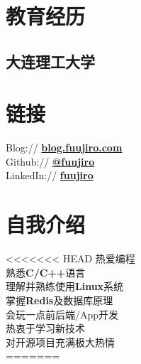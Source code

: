\documentclass[]{deedy-resume-openfont}
\begin{document}
%
%
\lastupdated

%
%

%
%

\begin{minipage}[t]{0.25\textwidth} 


\section{教育经历} 
\sectionsep

\subsection{大连理工大学}
\sectionsep


\section{链接}
\sectionsep
Blog://  \href{https://blog.fuujiro.com/}{\bf blog.fuujiro.com} \\  
Github:// \href{https://github.com/fuujiro}{\bf @fuujiro} \\
LinkedIn://  \href{https://www.linkedin.com/in/fuujiro}{\bf fuujiro} \\


\section{自我介绍}
<<<<<<< HEAD
热爱编程 \\
熟悉\textbf{C/C++}语言 \\
理解并熟练使用\textbf{Linux}系统 \\
掌握\textbf{Redis}及数据库原理 \\
会玩一点前后端/App开发 \\
热衷于学习新技术 \\
对开源项目充满极大热情 \\
=======

\end{minipage}
\end{document}
